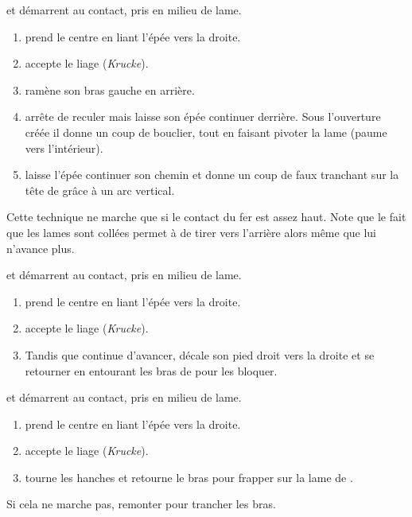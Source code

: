 \begin{technique}

\A et \D démarrent au contact, pris en milieu de lame.

\begin{enumerate}
	\item \A prend le centre en liant l'épée vers la droite.
	\item \D accepte le liage (\emph{Krucke}).
	\item \D ramène son bras gauche en arrière.
	\item \D arrête de reculer mais laisse son épée continuer derrière.
		Sous l'ouverture créée il donne un coup de bouclier, tout en faisant pivoter la lame (paume vers l'intérieur).
	\item \D laisse l'épée continuer son chemin et donne un coup de faux tranchant sur la tête de \A grâce à un arc vertical.
\end{enumerate}

Cette technique ne marche que si le contact du fer est assez haut.
Note que le fait que les lames sont collées permet à \D de tirer \A vers l'arrière alors même que lui n'avance plus.

\end{technique}


\begin{technique}

\A et \D démarrent au contact, pris en milieu de lame.

\begin{enumerate}
	\item \A prend le centre en liant l'épée vers la droite.
	\item \D accepte le liage (\emph{Krucke}).
	\item Tandis que \A continue d'avancer, \D décale son pied droit vers la droite et se retourner en entourant les bras de \A pour les bloquer.
\end{enumerate}


\end{technique}


\begin{technique}

\A et \D démarrent au contact, pris en milieu de lame.

\begin{enumerate}
	\item \A prend le centre en liant l'épée vers la droite.
	\item \D accepte le liage (\emph{Krucke}).
	\item \D tourne les hanches et retourne le bras pour frapper sur la lame de \A.
\end{enumerate}

Si cela ne marche pas, remonter pour trancher les bras.

\end{technique}
